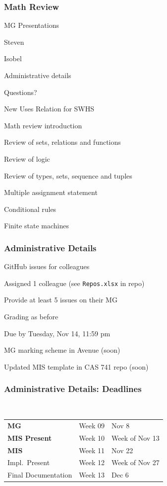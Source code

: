 \documentclass[t,12pt,numbers,fleqn]{beamer}
\begin{document}



\begin{frame}
\frametitle{Math Review}

\bi
\item MG Presentations
\bi
\item Steven
\item Isobel
\ei
\item Administrative details
\item Questions?
\item New Uses Relation for SWHS
\item Math review introduction
\item Review of sets, relations and functions
\item Review of logic
\item Review of types, sets, sequence and tuples
\item Multiple assignment statement
\item Conditional rules
\item Finite state machines
\ei
\end{frame}


\begin{frame}
\frametitle{Administrative Details}

\bi
\item GitHub issues for colleagues
\bi
\item Assigned 1 colleague (see \texttt{Repos.xlsx} in repo)
\item Provide at least 5 issues on their MG
\item Grading as before
\item Due by Tuesday, Nov 14, 11:59 pm
\ei
\item MG marking scheme in Avenue (soon)
\item Updated MIS template in CAS 741 repo (soon)
\ei

\end{frame}


\begin{frame}
\frametitle{Administrative Details: Deadlines}
~\newline
\begin{tabular}{l l l}
\textbf{MG} & Week 09 & Nov 8\\
\textbf{MIS Present} & Week 10 & Week of Nov 13\\
\textbf{MIS} & Week 11 & Nov 22\\
Impl.\ Present & Week 12 & Week of Nov 27\\
Final Documentation & Week 13 & Dec 6\\
\end {tabular}

\end{frame}
\end{document}
